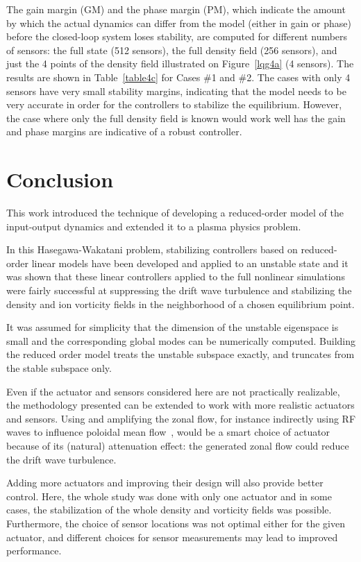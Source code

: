 \documentclass[12pt,lot, lof]{puthesis}
\begin{document}
The gain margin (GM) and the phase margin (PM), which indicate the amount by which the actual dynamics can differ from the model (either in gain or phase) before the closed-loop system loses stability, are computed for different numbers of sensors: the full state (512 sensors), the full density field (256 sensors), and just the 4 points of the density field illustrated on Figure~\ref{lqg4a} (4 sensors). The results are shown in Table~\ref{table4c} for Cases \#1 and \#2. The cases with only 4 sensors have very small stability margins, indicating that the model needs to be very accurate in order for the controllers to stabilize the equilibrium.
However, the case where only the full density field is known would work well has the gain and phase margins are indicative of a robust controller.

\section{Conclusion}

This work introduced the technique of developing a reduced-order model of the input-output dynamics and extended it to a plasma physics problem.

In this Hasegawa-Wakatani problem, stabilizing controllers based on reduced-order linear models have been developed and applied to an unstable state and it was shown that these linear controllers applied to the full nonlinear simulations were fairly successful at suppressing the drift wave turbulence  and stabilizing the density and ion vorticity fields in the neighborhood of a chosen equilibrium point.

It was assumed for simplicity that the dimension of the unstable eigenspace is small and the corresponding global modes can be numerically computed. Building the reduced order model treats the unstable subspace exactly, and truncates from the stable subspace only.
 
Even if the actuator and sensors considered here are not practically realizable, the methodology presented can be extended to work with more realistic actuators and sensors.
Using and amplifying the zonal flow, for instance indirectly using RF waves to influence poloidal mean flow~\cite{LeBlanc1999}, would be a smart choice of actuator because of its (natural) attenuation effect: the generated zonal flow could reduce the drift wave turbulence.

Adding more actuators and improving their design will also provide better control. Here, the whole study was done with only one actuator and in some cases, the stabilization of the whole density and vorticity fields was possible.
Furthermore, the choice of sensor locations was not optimal either for the given actuator, and different choices for sensor measurements may lead to improved performance. 
\end{document}
